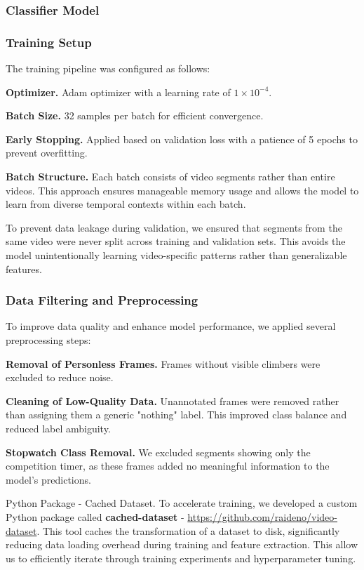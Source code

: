 \subsubsection*{Classifier Model}

\subsubsection*{Training Setup}
The training pipeline was configured as follows:

\noindent\textbf{Optimizer.} Adam optimizer with a learning rate of $1 \times 10^{-4}$.

\noindent\textbf{Batch Size.} 32 samples per batch for efficient convergence.

\noindent\textbf{Early Stopping.} Applied based on validation loss with a patience of 5 epochs to prevent overfitting.

\noindent\textbf{Batch Structure.} Each batch consists of video segments rather than entire videos. This approach ensures manageable memory usage and allows the model to learn from diverse temporal contexts within each batch.

To prevent data leakage during validation, we ensured that segments from the same video were never split across training and validation sets. This avoids the model unintentionally learning video-specific patterns rather than generalizable features.

\subsubsection*{Data Filtering and Preprocessing}
To improve data quality and enhance model performance, we applied several preprocessing steps:

\noindent\textbf{Removal of Personless Frames.} Frames without visible climbers were excluded to reduce noise.

\noindent\textbf{Cleaning of Low-Quality Data.} Unannotated frames were removed rather than assigning them a generic "nothing" label. This improved class balance and reduced label ambiguity.

\noindent\textbf{Stopwatch Class Removal.} We excluded segments showing only the competition timer, as these frames added no meaningful information to the model's predictions.

\begin{AIbox}{Python Package - Cached Dataset.}
    To accelerate training, we developed a custom Python package called \textbf{cached-dataset} - \href{https://github.com/raideno/video-dataset}{https://github.com/raideno/video-dataset}. This tool caches the transformation of a dataset to disk, significantly reducing data loading overhead during training and feature extraction. This allow us to efficiently iterate through training experiments and hyperparameter tuning.
\end{AIbox}

